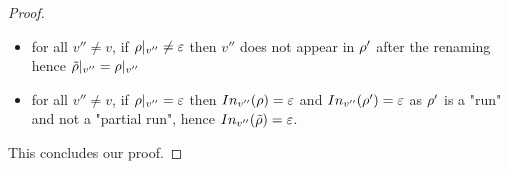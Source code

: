 \begin{proof}
\begin{itemize}
		\item for all $v'' \neq v$, if ${\rho}|_{v''} \neq \varepsilon$ then $v''$ does not appear in $\rho'$ after the renaming hence ${\Tilde{\rho}}|_{v''} = {\rho}|_{v''}$
		
		\item for all $v'' \neq v$, if ${\rho}|_{v''} = \varepsilon$ then $\vinput{v''}{\run} = \varepsilon$ and $\vinput{v''}{\run'} = \varepsilon$ as $\rho'$ is a "run" and not a "partial run", hence $\vinput{v''}{\Tilde{\run}} = \varepsilon$.
	\end{itemize}
	This concludes our proof.
\end{proof}

%	
%	
%	
%	
%		
%		
%		

